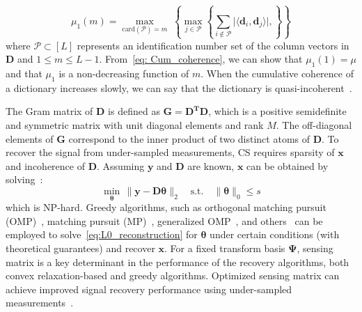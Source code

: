 %
\begin{equation}
    \label{eq: Cum_coherence}
    \mu_{1}(m) = \underset{\text{card}(\bm{\mathcal{P}}) = m}{\max}\; \left\{ \underset{j \in \bm{\mathcal{P}}}{\max}\left\{\underset{i \notin \bm{\mathcal{P}}}{\sum} \lvert\langle \bm{d}_{i},\bm{d}_{j} \rangle\rvert,  \right\}  \right\}
\end{equation}
%
where $\bm{\mathcal{P}} \subset \left[L\right]$ represents an identification number set of the column vectors in $\bm{D}$ and $1 \leq m \leq L-1$.
From~\eqref{eq: Cum_coherence}, we can show that $\mu_{1}(1) = \mu$ and that $\mu_{1}$ is a non-decreasing function of $m$.
When the cumulative coherence of a dictionary increases slowly, we can say that the dictionary is quasi-incoherent~\cite{Greed}.

The Gram matrix of $\bm{D}$ is defined as $\bm{G} = \bm{D^{T}}\bm{D}$, which is a positive semidefinite and symmetric matrix with unit diagonal elements and rank $M$. The off-diagonal elements of $\bm{G}$ correspond to the inner product of two distinct atoms of $\bm{D}$. To recover the signal from under-sampled measurements, CS requires sparsity of $\bm{x}$ and incoherence of $\bm{D}$. Assuming $\bm{y}$ and $\bm{D}$ are known, $\bm{x}$ can be obtained by solving~\cite{Atomic_BP, Greed_OMP, OMP_new}:
\begin{equation}
    \label{eq:L0_reconstruction}
    \underset{\bm{\theta}}{\min}\, \| \bm{y} - \bm{D}\bm{\theta}\|_{2}  \quad \text{s.t.} \quad \|\bm{\theta}\|_{0} \leq s %
\end{equation}
which is NP-hard. Greedy algorithms, such as orthogonal matching pursuit (OMP)~\cite{Atomic_BP, Greed_OMP, Tropp}, matching pursuit (MP)~\cite{Mallat}, generalized OMP~\cite{Jian}, and others~\cite{chen_recovery} can be employed to solve~\eqref{eq:L0_reconstruction} for $\bm{\theta}$ under certain conditions (with theoretical guarantees) and recover $\bm{x}$. For a fixed transform basis $\bm{\Psi}$, sensing matrix is a key determinant in the performance of the recovery algorithms, both convex relaxation-based and greedy algorithms. Optimized sensing matrix can achieve improved signal recovery performance using under-sampled measurements~\cite{Elad}. 

